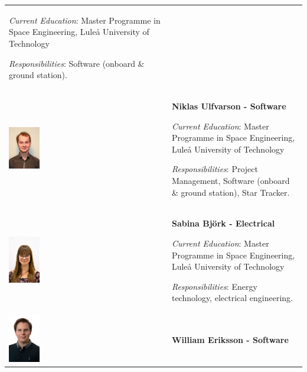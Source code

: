 \begin{longtable}[]{m{} m{}}
\smallskip
\textit{Current Education}: Master Programme in Space Engineering, Luleå University of Technology

\smallskip
\textit{Responsibilities}: Software (onboard \& ground station).
\bigskip
\\

\includegraphics[width=0.2\textwidth]{0-cover/img/TEAMPICS/Niklas_final.jpg}  & \textbf{Niklas Ulfvarson - Software}

\smallskip
\textit{Current Education}: Master Programme in Space Engineering, Luleå University of Technology

\smallskip
\textit{Responsibilities}: Project Management, Software (onboard \& ground station), Star Tracker.
\bigskip
\\

\includegraphics[width=0.2\textwidth]{0-cover/img/TEAMPICS/Sabina_final.jpg}  & \textbf{Sabina Bj\"ork - Electrical}

\smallskip
\textit{Current Education}: Master Programme in Space Engineering, Luleå University of Technology

\smallskip
\textit{Responsibilities}: Energy technology, electrical engineering.
\bigskip
\\

\includegraphics[width=0.2\textwidth]{0-cover/img/TEAMPICS/William_final.jpg}  & \textbf{William Eriksson - Software}


\end{longtable}

